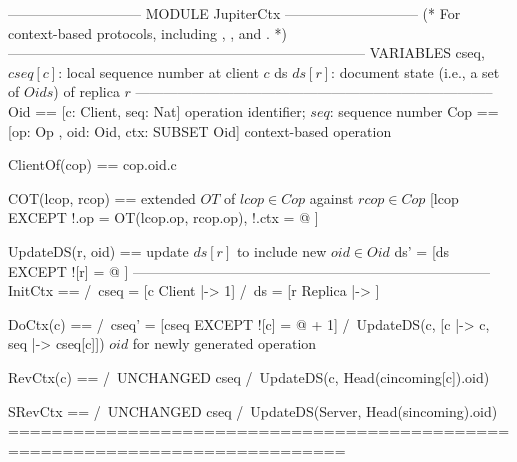 \documentclass{article}
\begin{document}
\begin{tla}
----------------------------- MODULE JupiterCtx -----------------------------
(*
For context-based \jupiter{} protocols, including \absjupiter{}, \cjupiter{}, and \xjupiter{}.
*)
-----------------------------------------------------------------------------
VARIABLES cseq, \* $cseq[c]$: local sequence number at client $c$
          ds    \* $ds[r]$: document state (i.e., a set of $Oids$) of replica $r$
-----------------------------------------------------------------------------
Oid == [c: Client, seq: Nat] \* operation identifier; $seq$: sequence number
Cop == [op: Op , oid: Oid, ctx: SUBSET Oid] \* context-based operation

ClientOf(cop) == cop.oid.c

COT(lcop, rcop) == \* extended $OT$ of $lcop \in Cop$ against $rcop \in Cop$
    [lcop EXCEPT !.op = OT(lcop.op, rcop.op), !.ctx = @ ]

UpdateDS(r, oid) == \* update $ds[r]$ to include new $oid \in Oid$
    ds' = [ds EXCEPT ![r] = @ ]
-----------------------------------------------------------------------------
InitCtx ==
    /\ cseq = [c \in Client |-> 1]
    /\ ds = [r \in Replica |-> {}]
    
DoCtx(c) ==
    /\ cseq' = [cseq EXCEPT ![c] = @ + 1]
    /\ UpdateDS(c, [c |-> c, seq |-> cseq[c]])  \* $oid$ for newly generated operation

RevCtx(c) ==
    /\ UNCHANGED cseq
    /\ UpdateDS(c, Head(cincoming[c]).oid)
    
SRevCtx ==
    /\ UNCHANGED cseq
    /\ UpdateDS(Server, Head(sincoming).oid)
=============================================================================
\end{tla}
\end{document}
